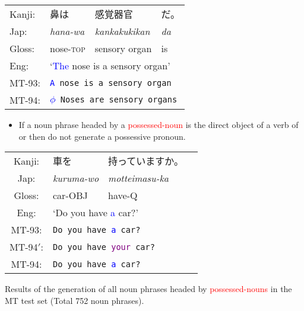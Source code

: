 \documentclass[a4paper,landscape,headrule,footrule,xetex]{foils}
\newcommand{\psp}[1]{\textcolor{purple}{#1}}
\newcommand{\dtr}[1]{\textcolor{blue}{#1}}
\newcommand{\trg}[1]{\textcolor{red}{#1}}
\begin{document}
\begin{exe}
  \ex
\begin{tabular}[t]{llll}
Kanji: &  鼻は &  感覚器官 &  だ。 \\
Jap:   &  \sl hana-wa &  \sl kankakukikan & \sl da  \\
Gloss: &   nose-\textsc{top} &  sensory organ &  is  \\
Eng:   & \multicolumn{3}{l}{`\dtr{The} nose is a sensory organ'} \\
MT-93: & \multicolumn{3}{l}{\tt \dtr{A} nose is a sensory organ} \\
MT-94: & \multicolumn{3}{l}{\tt \dtr{$\phi$} Noses are sensory organs}
\end{tabular}
\end{exe}



\begin{itemize}
\item If a noun phrase headed by a \trg{possessed-noun} is the direct object
  of a verb of  or  then do not
  generate a possessive pronoun.
\end{itemize}

\begin{exe} 
\ex
\begin{tabular}[t]{clll}
Kanji: &  車を &  持っていますか。\\
Jap:   &  \sl kuruma-wo & \sl motteimasu-ka  \\
Gloss: &  car-{\sc OBJ} &  have-{\sc Q}  \\
Eng:   & \multicolumn{2}{l}{`Do you have \dtr{a} car?'} \\
MT-93: & \multicolumn{2}{l}{\tt Do you have \dtr{a} car?} \\
MT-94$'$: & \multicolumn{2}{l}{\tt Do you have \psp{your} car?} \\
MT-94: & \multicolumn{2}{l}{\tt Do you have \dtr{a} car?}
\end{tabular}
\end{exe}



Results of the generation of all noun phrases headed by
\trg{possessed-nouns} in the MT test set (Total 752 noun phrases).
\end{document}
